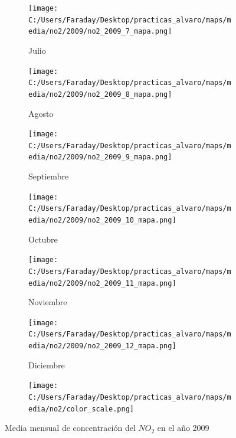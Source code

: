 \documentclass[12pt]{article}
\begin{document}
\begin{figure}[H]
\begin{subfigure}[H]{0.15\textwidth}
\texttt{[image: C:/Users/Faraday/Desktop/practicas\_alvaro/maps/media/no2/2009/no2\_2009\_7\_mapa.png]}
\captionsetup{labelformat=empty}
\caption{Julio}
\label{fig:map-no2-2009-7}
\end{subfigure}
%
\begin{subfigure}[H]{0.15\textwidth}
\texttt{[image: C:/Users/Faraday/Desktop/practicas\_alvaro/maps/media/no2/2009/no2\_2009\_8\_mapa.png]}
\captionsetup{labelformat=empty}
\caption{Agosto}
\label{fig:map-no2-2009-8}
\end{subfigure}
%
\begin{subfigure}[H]{0.15\textwidth}
\texttt{[image: C:/Users/Faraday/Desktop/practicas\_alvaro/maps/media/no2/2009/no2\_2009\_9\_mapa.png]}
\captionsetup{labelformat=empty}
\caption{Septiembre}
\label{fig:map-no2-2009-9}
\end{subfigure}
%
\begin{subfigure}[H]{0.15\textwidth}
\texttt{[image: C:/Users/Faraday/Desktop/practicas\_alvaro/maps/media/no2/2009/no2\_2009\_10\_mapa.png]}
\captionsetup{labelformat=empty}
\caption{Octubre}
\label{fig:map-no2-2009-10}
\end{subfigure}
%
\begin{subfigure}[H]{0.15\textwidth}
\texttt{[image: C:/Users/Faraday/Desktop/practicas\_alvaro/maps/media/no2/2009/no2\_2009\_11\_mapa.png]}
\captionsetup{labelformat=empty}
\caption{Noviembre}
\label{fig:map-no2-2009-11}
\end{subfigure}
%
\begin{subfigure}[H]{0.15\textwidth}
\texttt{[image: C:/Users/Faraday/Desktop/practicas\_alvaro/maps/media/no2/2009/no2\_2009\_12\_mapa.png]}
\captionsetup{labelformat=empty}
\caption{Diciembre}
\label{fig:map-no2-2009-12}
\end{subfigure}

\begin{subfigure}[H]{0.45\textwidth}
\texttt{[image: C:/Users/Faraday/Desktop/practicas\_alvaro/maps/media/no2/color\_scale.png]}
\captionsetup{labelformat=empty}
\caption{}
\end{subfigure}

\vspace*{-7mm}
\caption{Media mensual de concentración del $NO_{2}$ en el año 2009}
\label{fig:map-no2-2009}
\end{figure}
\end{document}
